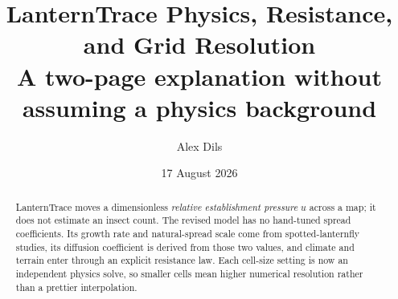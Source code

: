 \documentclass[10pt]{article}
\title{\vspace{-1.5em}LanternTrace Physics, Resistance, and Grid Resolution\\\large A two-page explanation without assuming a physics background}
\author{Alex Dils}
\date{17 August 2026}
\begin{document}
\maketitle
\vspace{-1.6em}
\fontsize{9}{10.35}\selectfont

\begin{abstract}
LanternTrace moves a dimensionless \emph{relative establishment pressure} $u$ across a map; it does not estimate an insect count.  The revised model has no hand-tuned spread coefficients.  Its growth rate and natural-spread scale come from spotted-lanternfly studies, its diffusion coefficient is derived from those two values, and climate and terrain enter through an explicit resistance law.  Each cell-size setting is now an independent physics solve, so smaller cells mean higher numerical resolution rather than a prettier interpolation.
\end{abstract}
\vspace{-0.6em}
\end{document}
